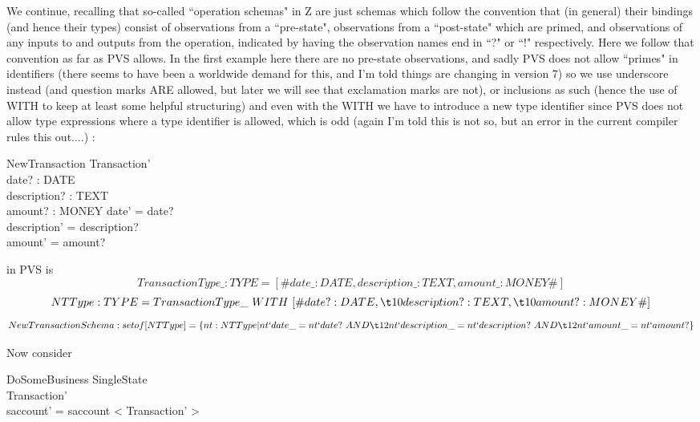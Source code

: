 \documentclass[11pt]{amsart}
\begin{document}
%
%

We continue, recalling that so-called ``operation schemas" in Z are just schemas which follow the convention that (in general) their bindings (and hence their types) consist of observations from a ``pre-state", observations from a ``post-state" which are primed, and observations of any inputs to and outputs from the operation, indicated by having the observation names end in ``?" or ``!" respectively. Here we follow that convention as far as PVS allows. In the first example here there are no pre-state observations, and sadly PVS does not allow ``primes" in identifiers (there seems to have been a worldwide demand for this, and I'm told things are changing in version 7) so we use underscore instead (and question marks ARE allowed, but later we will see that exclamation marks are not), or inclusions as such (hence the use of WITH to keep at least some helpful structuring) and even with the WITH we have to introduce a new type identifier since PVS does not allow type expressions where a type identifier is allowed, which is odd (again I'm told this is not so, but an error in the current compiler rules this out....) :
\begin{schema}{NewTransaction}
Transaction'\\
date? : DATE\\
description? : TEXT\\
amount? : MONEY
\where
date' = date?\\
description' = description?\\
amount' = amount?
\end{schema}
in PVS is
\[
TransactionType\_ : TYPE = [\# date\_ : DATE, description\_ : TEXT, amount\_ : MONEY \#]
\]
\[
NTType : TYPE = TransactionType\_\ WITH\ [\# date? : DATE, \\
\t10 description? : TEXT, \\
\t10 amount? : MONEY \#]
\]
\[
NewTransactionSchema : setof[NTType] = \{nt : NTType | nt`date\_ = nt`date?\ AND\\
\t12nt`description\_ = nt`description?\ AND\\
\t12 nt`amount\_ = nt`amount? \}
\]

Now consider
\begin{schema}{\Phi DoSomeBusiness}
\Delta SingleState\\
Transaction'\\
\where
saccount' = saccount \cat < \theta Transaction' >
\end{schema}
\end{document}
